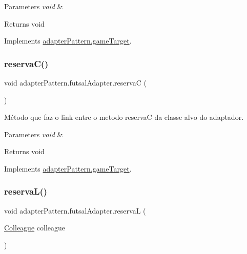\begin{DoxyParams}{Parameters}
{\em void} & \\
\hline
\end{DoxyParams}
\begin{DoxyReturn}{Returns}
void 
\end{DoxyReturn}


Implements \mbox{\hyperlink{interfaceadapter_pattern_1_1game_target_a67348260f14d11e317195e2d66dbff18}{adapter\+Pattern.\+game\+Target}}.

\mbox{\label{classadapter_pattern_1_1futsal_adapter_a154a41741f8c2bda7552797ada4915e3}} 
\subsubsection{\texorpdfstring{reservaC()}{reservaC()}}
{\footnotesize\ttfamily void adapter\+Pattern.\+futsal\+Adapter.\+reservaC (\begin{DoxyParamCaption}{ }\end{DoxyParamCaption})}



Método que faz o link entre o metodo reservaC da classe alvo do adaptador. 


\begin{DoxyParams}{Parameters}
{\em void} & \\
\hline
\end{DoxyParams}
\begin{DoxyReturn}{Returns}
void 
\end{DoxyReturn}


Implements \mbox{\hyperlink{interfaceadapter_pattern_1_1game_target_ae8c1c944929700a3e120e641118c9188}{adapter\+Pattern.\+game\+Target}}.

\mbox{\label{classadapter_pattern_1_1futsal_adapter_a00b5a3952a49e80ee156d62a7b59e372}} 
\subsubsection{\texorpdfstring{reservaL()}{reservaL()}}
{\footnotesize\ttfamily void adapter\+Pattern.\+futsal\+Adapter.\+reservaL (\begin{DoxyParamCaption}\item[{\mbox{\hyperlink{classmediator_pattern_1_1_colleague}{Colleague}}}]{colleague }\end{DoxyParamCaption})}



